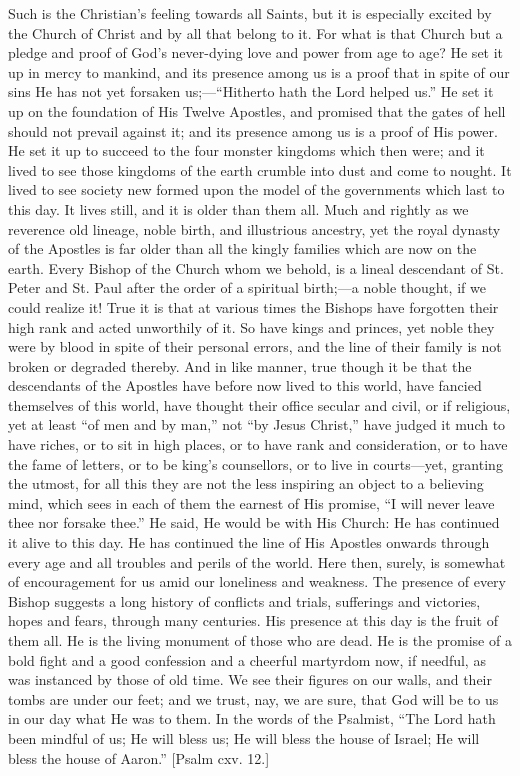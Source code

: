 Such is the Christian's feeling towards all Saints, but it is
especially excited by the Church of Christ and by all that belong to
it. For what is that Church but a pledge and proof of God's
never-dying love and power from age to age? He set it up in mercy to
mankind, and its presence among us is a proof that in spite of our
sins He has not yet forsaken us;—``Hitherto hath the Lord
helped us.'' He set it up on the foundation of His Twelve
Apostles, and promised that the gates of hell should not prevail
against it; and its presence among us is a proof of His power. He set
it up to succeed to the four monster kingdoms which then were; and it
lived to see those kingdoms of the earth crumble into dust and come to
nought. It lived to see society new formed upon the model of the
governments which last to this day. It lives still, and it is older
than them all. Much and rightly as we reverence old lineage, noble
birth, and illustrious ancestry, yet the royal dynasty of the Apostles
is far older than all the kingly families which are now on the earth.
Every Bishop of the Church whom we behold, is a lineal descendant of
St. Peter and St. Paul after the order of a spiritual birth;—a noble
thought, if we could realize it! True it is that at various times the
Bishops have forgotten their high rank and acted unworthily of it. So
have kings and princes, yet noble they were by blood in spite of their
personal errors, and the line of their family is not broken or
degraded thereby. And in like manner, true though it be that the
descendants of the Apostles have before now lived to this world, have
fancied themselves of this world, have thought their office secular
and civil, or if religious, yet at least ``of men and by
man,'' not ``by Jesus Christ,'' have judged it much to
have riches, or to sit in high places, or to have rank and
consideration, or to have the fame of letters, or to be king's
counsellors, or to live in courts—yet, granting the utmost, for all
this they are not the less inspiring an object to a believing mind,
which sees in each of them the earnest of His promise, ``I will
never leave thee nor forsake thee.'' He said, He would be with His
Church: He has continued it alive to this day. He has continued the
line of His Apostles onwards through every age and all troubles and
perils of the world. Here then, surely, is somewhat of encouragement
for us amid our loneliness and weakness. The presence of every Bishop
suggests a long history of conflicts and trials, sufferings and
victories, hopes and fears, through many centuries. His presence at
this day is the fruit of them all. He is the living monument of those
who are dead. He is the promise of a bold fight and a good confession
and a cheerful martyrdom now, if needful, as was instanced by those of
old time. We see their figures on our walls, and their tombs are under
our feet; and we trust, nay, we are sure, that God will be to us in
our day what He was to them. In the words of the Psalmist, ``The
Lord hath been mindful of us; He will bless us; He will bless the
house of Israel; He will bless the house of Aaron.'' [Psalm cxv.
12.]


